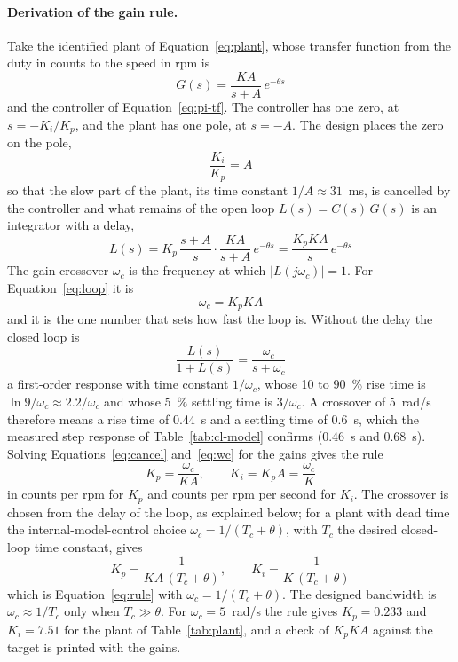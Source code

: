 \paragraph{Derivation of the gain rule.}
Take the identified plant of Equation~\ref{eq:plant}, whose transfer function from the duty in counts to the speed in rpm is
\begin{equation}
    G(s) = \frac{K A}{s + A}\, e^{-\theta s}
    \label{eq:plant-tf}
\end{equation}
and the controller of Equation~\ref{eq:pi-tf}. The controller has one zero, at $s = -K_i/K_p$, and the plant has one pole, at $s = -A$. The design places the zero on the pole,
\begin{equation}
    \frac{K_i}{K_p} = A
    \label{eq:cancel}
\end{equation}
so that the slow part of the plant, its time constant $1/A \approx 31$~ms, is cancelled by the controller and what remains of the open loop $L(s) = C(s)\,G(s)$ is an integrator with a delay,
\begin{equation}
    L(s) = K_p\,\frac{s + A}{s}\cdot\frac{K A}{s + A}\, e^{-\theta s} = \frac{K_p K A}{s}\, e^{-\theta s}
    \label{eq:loop}
\end{equation}
The gain crossover $\omega_c$ is the frequency at which $|L(j\omega_c)| = 1$. For Equation~\ref{eq:loop} it is
\begin{equation}
    \omega_c = K_p K A
    \label{eq:wc}
\end{equation}
and it is the one number that sets how fast the loop is. Without the delay the closed loop is
\begin{equation}
    \frac{L(s)}{1 + L(s)} = \frac{\omega_c}{s + \omega_c}
    \label{eq:cl-first}
\end{equation}
a first-order response with time constant $1/\omega_c$, whose 10 to 90~\% rise time is $\ln 9/\omega_c \approx 2.2/\omega_c$ and whose 5~\% settling time is $3/\omega_c$. A crossover of 5~rad/s therefore means a rise time of 0.44~s and a settling time of 0.6~s, which the measured step response of Table~\ref{tab:cl-model} confirms (0.46~s and 0.68~s). Solving Equations~\ref{eq:cancel} and~\ref{eq:wc} for the gains gives the rule
\begin{equation}
    K_p = \frac{\omega_c}{K A}, \qquad K_i = K_p A = \frac{\omega_c}{K}
    \label{eq:rule}
\end{equation}
in counts per rpm for $K_p$ and counts per rpm per second for $K_i$. The crossover is chosen from the delay of the loop, as explained below; for a plant with dead time the internal-model-control choice $\omega_c = 1/(T_c + \theta)$, with $T_c$ the desired closed-loop time constant, gives
\begin{equation}
    K_p = \frac{1}{K A\,(T_c + \theta)}, \qquad K_i = \frac{1}{K\,(T_c + \theta)}
    \label{eq:imc}
\end{equation}
which is Equation~\ref{eq:rule} with $\omega_c = 1/(T_c + \theta)$. The designed bandwidth is $\omega_c \approx 1/T_c$ only when $T_c \gg \theta$. For $\omega_c = 5$~rad/s the rule gives $K_p = 0.233$ and $K_i = 7.51$ for the plant of Table~\ref{tab:plant}, and a check of $K_p K A$ against the target is printed with the gains.

